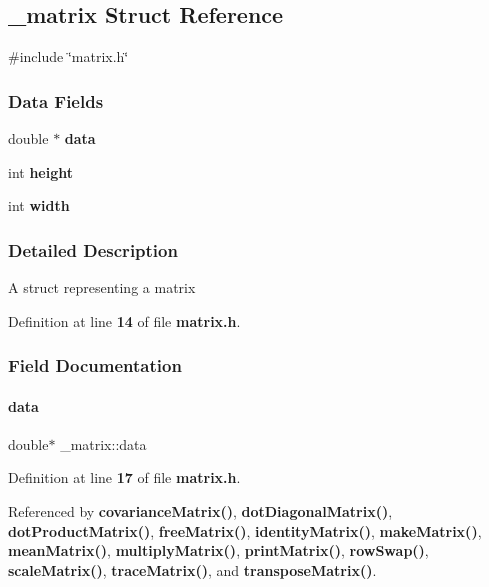 \subsection{\+\_\+matrix Struct Reference}
\label{struct__matrix}


{\ttfamily \#include \char`\"{}matrix.\+h\char`\"{}}

\subsubsection*{Data Fields}
\begin{DoxyCompactItemize}
\item 
double $\ast$ \textbf{ data}
\item 
int \textbf{ height}
\item 
int \textbf{ width}
\end{DoxyCompactItemize}


\subsubsection{Detailed Description}
A struct representing a matrix 

Definition at line \textbf{ 14} of file \textbf{ matrix.\+h}.



\subsubsection{Field Documentation}
\mbox{\label{struct__matrix_ad3fdadaa9e22623d5830e37663d500be}} 
\paragraph{data}
{\footnotesize\ttfamily double$\ast$ \+\_\+matrix\+::data}



Definition at line \textbf{ 17} of file \textbf{ matrix.\+h}.



Referenced by \textbf{ covariance\+Matrix()}, \textbf{ dot\+Diagonal\+Matrix()}, \textbf{ dot\+Product\+Matrix()}, \textbf{ free\+Matrix()}, \textbf{ identity\+Matrix()}, \textbf{ make\+Matrix()}, \textbf{ mean\+Matrix()}, \textbf{ multiply\+Matrix()}, \textbf{ print\+Matrix()}, \textbf{ row\+Swap()}, \textbf{ scale\+Matrix()}, \textbf{ trace\+Matrix()}, and \textbf{ transpose\+Matrix()}.


